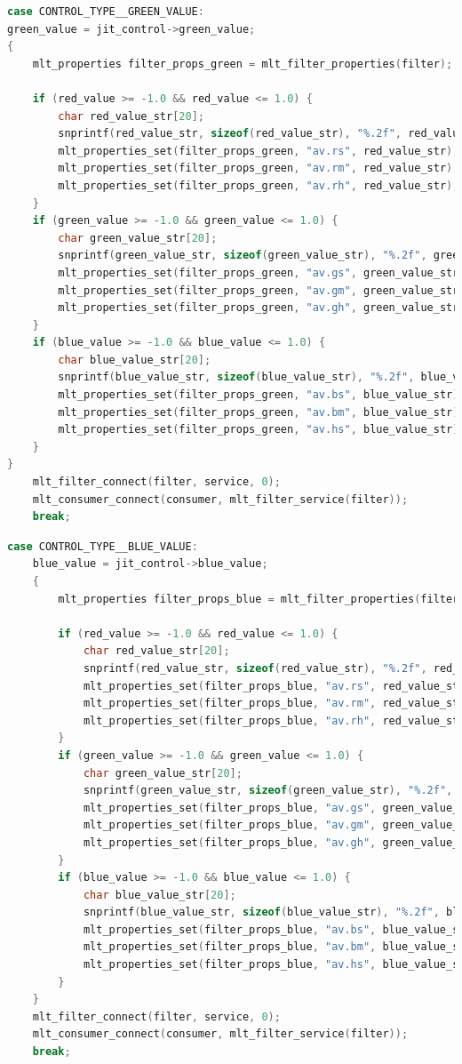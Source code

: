 \documentclass[../MasterThesis.tex]{subfiles}
\begin{document}
\begin{lstlisting}[language=c, numbers=none, columns=fullflexible]
case CONTROL_TYPE__GREEN_VALUE:
green_value = jit_control->green_value;
{
	mlt_properties filter_props_green = mlt_filter_properties(filter);
	
	if (red_value >= -1.0 && red_value <= 1.0) {
		char red_value_str[20]; 
		snprintf(red_value_str, sizeof(red_value_str), "%.2f", red_value);
		mlt_properties_set(filter_props_green, "av.rs", red_value_str);
		mlt_properties_set(filter_props_green, "av.rm", red_value_str);
		mlt_properties_set(filter_props_green, "av.rh", red_value_str);
	}	
	if (green_value >= -1.0 && green_value <= 1.0) {
		char green_value_str[20]; 
		snprintf(green_value_str, sizeof(green_value_str), "%.2f", green_value);
		mlt_properties_set(filter_props_green, "av.gs", green_value_str);
		mlt_properties_set(filter_props_green, "av.gm", green_value_str);
		mlt_properties_set(filter_props_green, "av.gh", green_value_str);
	}		
	if (blue_value >= -1.0 && blue_value <= 1.0) {
		char blue_value_str[20]; 
		snprintf(blue_value_str, sizeof(blue_value_str), "%.2f", blue_value);
		mlt_properties_set(filter_props_green, "av.bs", blue_value_str);
		mlt_properties_set(filter_props_green, "av.bm", blue_value_str);
		mlt_properties_set(filter_props_green, "av.hs", blue_value_str);
	}		
}	
	mlt_filter_connect(filter, service, 0);
	mlt_consumer_connect(consumer, mlt_filter_service(filter));
	break;

\end{lstlisting}


\begin{lstlisting}[language=c, numbers=none, columns=fullflexible]	
case CONTROL_TYPE__BLUE_VALUE:
	blue_value = jit_control->blue_value;
	{
		mlt_properties filter_props_blue = mlt_filter_properties(filter);
		
		if (red_value >= -1.0 && red_value <= 1.0) {
			char red_value_str[20]; 
			snprintf(red_value_str, sizeof(red_value_str), "%.2f", red_value);
			mlt_properties_set(filter_props_blue, "av.rs", red_value_str);
			mlt_properties_set(filter_props_blue, "av.rm", red_value_str);
			mlt_properties_set(filter_props_blue, "av.rh", red_value_str);
		}	
		if (green_value >= -1.0 && green_value <= 1.0) {
			char green_value_str[20]; 
			snprintf(green_value_str, sizeof(green_value_str), "%.2f", green_value);
			mlt_properties_set(filter_props_blue, "av.gs", green_value_str);
			mlt_properties_set(filter_props_blue, "av.gm", green_value_str);
			mlt_properties_set(filter_props_blue, "av.gh", green_value_str);
		}	
		if (blue_value >= -1.0 && blue_value <= 1.0) {
			char blue_value_str[20]; 
			snprintf(blue_value_str, sizeof(blue_value_str), "%.2f", blue_value);
			mlt_properties_set(filter_props_blue, "av.bs", blue_value_str);
			mlt_properties_set(filter_props_blue, "av.bm", blue_value_str);
			mlt_properties_set(filter_props_blue, "av.hs", blue_value_str);
		}	
	}
	mlt_filter_connect(filter, service, 0);
	mlt_consumer_connect(consumer, mlt_filter_service(filter));
	break;  

\end{lstlisting}



	
	
	
\end{document}
